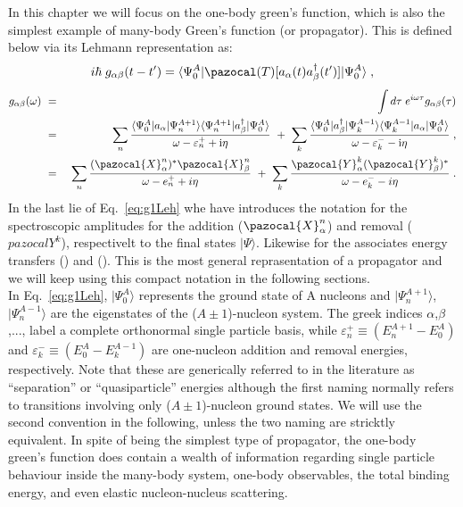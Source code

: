 In this chapter we will focus on the one-body green's function, which is also the simplest example of many-body Green's function (or propagator). This is defined below via its Lehmann representation as:
\begin{equation}
 i\hbar \; g_{\alpha\beta}(t - t') =  \langle\Psi^A_0\vert  \pazocal(T) [ a_\alpha(t)   a^\dagger_\beta(t') ]  \vert\Psi^A_0\rangle \; ,
 \label{eq:g1Time}
\end{equation}
\begin{eqnarray}
 g_{\alpha\beta}(\omega) ~&=&~ \int d\tau \; e^{i\omega\tau} g_{\alpha\beta}(\tau)
 \nonumber \\
 &=&~
 \sum_n  \frac{ 
          \langle\Psi^A_0\vert  	a_\alpha   \vert\Psi^{A+1}_n\rangle
          \langle\Psi^{A+1}_n\vert  a^\dagger_\beta  \vert\Psi^A_0\rangle
              }{\omega - \varepsilon_n^{+} + {\rm i} \eta }
 ~+~ \sum_k \frac{
 		  \langle\Psi^A_0\vert  	a^\dagger_\beta   \vert\Psi^{A-1}_k\rangle
          \langle\Psi^{A-1}_k\vert  a_\alpha  \vert\Psi^A_0\rangle
              }{\omega - \varepsilon_k^{-} - {\rm i} \eta } \; ,
 \nonumber \\
  &=&~ \sum_n \frac{(\pazocal{X}^{n}_\alpha)^*  \pazocal{X}^{n}_\beta}{\omega  - e^+_{n} + i\eta} 
        ~+~ \sum_k \frac{\pazocal{Y}^{k}_\alpha  (\pazocal{Y}^{k}_\beta)^*}{\omega  - e^-_{k} - i\eta}  \; .
\label{eq:g1Leh}
\end{eqnarray}
In the last lie of Eq.~\eqref{eq:g1Leh} whe have introduces the notation for the spectroscopic amplitudes for the addition ($\pazocal{X}^{n}_\alpha$) and removal ($pazocal{Y}^{k}$), respectivelt to the final states $|\Psi\rangle$. Likewise for the associates energy transfers () and ().  This is the most general reprasentation of a propagator and we will keep using this compact notation in the following sections. \\
In Eq.~\eqref{eq:g1Leh}, $\vert\Psi^A_0\rangle$ represents the ground state of A nucleons and $\vert\Psi^{A+1}_n\rangle$, $\vert\Psi^{A-1}_n\rangle$ are the eigenstates  of the ($A\pm1$)-nucleon system. The greek indices $\alpha$,$\beta$,..., label a complete orthonormal single particle basis, while
\hbox{$\varepsilon_n^{+}\equiv(E^{A+1}_n - E^A_0)$} and 
\hbox{$\varepsilon_k^{-}\equiv(E^A_0 - E^{A-1}_k)$}
are one-nucleon addition and removal energies, respectively. 
 Note that these are generically referred to in the literature as ``separation'' or ``quasiparticle'' energies although the first naming normally refers to transitions involving only ($A\pm1$)-nucleon ground states.  We will use the second convention in the following, unless the two naming are stricktly equivalent.
In spite of being the simplest type of propagator, the one-body green's function does contain a wealth of information regarding single particle behaviour inside the many-body system, one-body observables, the total binding energy, and even elastic nucleon-nucleus scattering.

